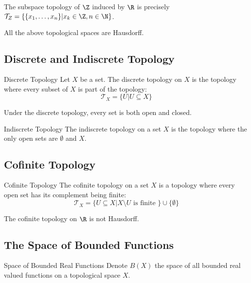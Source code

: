 \begin{prp}{}{} The subspace topology of $\Z$ induced by $\R$ is precisely $\mathcal{T}_Z=\{\{x_1,\dots,x_n\}|x_k\in\Z,n\in\N\}$. 
\end{prp}

\begin{prp}{}{} All the above topological spaces are Hausdorff. 
\end{prp}

\subsection{Discrete and Indiscrete Topology}
\begin{defn}{Discrete Topology}{} Let $X$ be a set. The discrete topology on $X$ is the topology where every subset of $X$ is part of the topology: $$\mathcal{T}_X=\{U|U\subseteq X\}$$
\end{defn}

\begin{prp}{}{} Under the discrete topology, every set is both open and closed. 
\end{prp}

\begin{defn}{Indiscrete Topology}{} The indiscrete topology on a set $X$ is the topology where the only open sets are $\emptyset$ and $X$. 
\end{defn}

\subsection{Cofinite Topology}
\begin{defn}{Cofinite Topology}{} The cofinite topology on a set $X$ is a topology where every open set has its complement being finite: $$\mathcal{T}_X=\{U\subseteq X|X\setminus U\text{ is finite }\}\cup\{\emptyset\}$$
\end{defn}

\begin{prp}{}{} The cofinite topology on $\R$ is not Hausdorff. 
\end{prp}

\subsection{The Space of Bounded Functions}
\begin{defn}{Space of Bounded Real Functions}{} Denote $B(X)$ the space of all bounded real valued functions on a topological space $X$. 
\end{defn}

